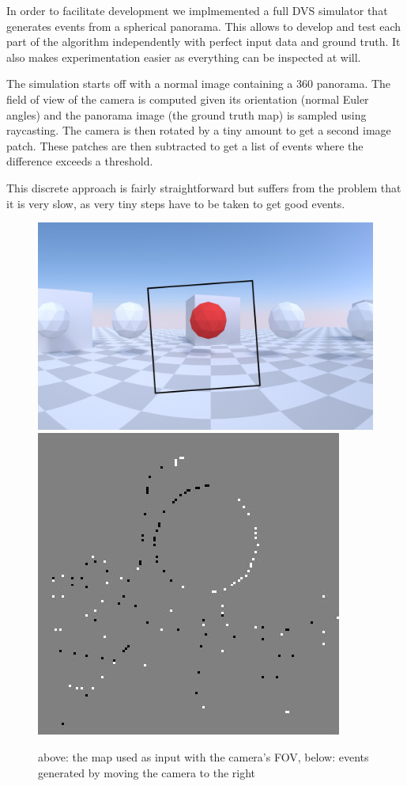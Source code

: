 In order to facilitate development we implmemented a full DVS simulator that
generates events from a spherical panorama.  This allows to develop and test
each part of the algorithm independently with perfect input data and ground
truth. It also makes experimentation easier as everything can be inspected at
will.

The simulation starts off with a normal image containing a 360\textdegree
panorama. The field of view of the camera is computed given its orientation
(normal Euler angles) and the panorama image (the ground truth map) is sampled
using raycasting. The camera is then rotated by a tiny amount to get a second
image patch. These patches are then subtracted to get a list of events where
the difference exceeds a threshold.

This discrete approach is fairly straightforward but suffers from the problem
that it is very slow, as very tiny steps have to be taken to get good events.

\begin{figure}
\includegraphics[width=\linewidth]{images/simulation_raw.jpg}
\includegraphics[width=\linewidth]{images/simulation_events.jpg}
\caption{above: the map used as input with the camera's FOV, below: events generated by moving the camera to the right}
\label{fig:simulation}
\end{figure}
